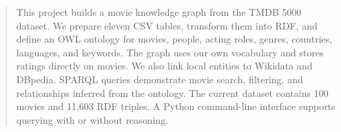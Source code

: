 \begin{abstract}
This project builds a movie knowledge graph from the TMDB 5000 dataset. We prepare eleven CSV tables, transform them into RDF, and define an OWL ontology for movies, people, acting roles, genres, countries, languages, and keywords. The graph uses our own vocabulary and stores ratings directly on movies. We also link local entities to Wikidata and DBpedia. SPARQL queries demonstrate movie search, filtering, and relationships inferred from the ontology. The current dataset contains 100 movies and 11,603 RDF triples. A Python command-line interface supports querying with or without reasoning.
\end{abstract}
